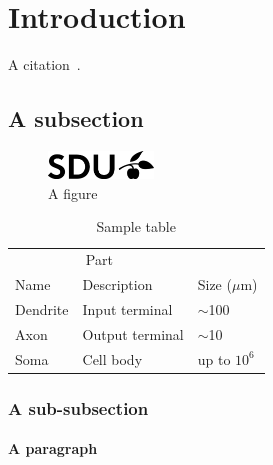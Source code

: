 \section{Introduction}
\label{sec:introduction}

A citation~\cite{Hasselmo5249}. 
\lipsum[1-3]

\subsection{A subsection}
\label{sec:asubsection}

\lipsum[1-2]

\begin{figure}
    \centering
    \includegraphics[width=0.25\textwidth]{figures/SDU-no-title.png}
    \caption{A figure}
    \label{fig:figure}
\end{figure}

\lipsum[3-4]

\begin{table}
  \caption{Sample table}
  \label{sample-table}
  \centering
  \begin{tabular}{lll}
    \toprule
    \multicolumn{2}{c}{Part}                   \\
    \cmidrule(r){1-2}
    Name     & Description     & Size ($\mu$m) \\
    \midrule
    Dendrite & Input terminal  & $\sim$100     \\
    Axon     & Output terminal & $\sim$10      \\
    Soma     & Cell body       & up to $10^6$  \\
    \bottomrule
  \end{tabular}
\end{table}

\subsubsection{A sub-subsection}

\lipsum[5]

\paragraph{A paragraph} \lipsum[6]